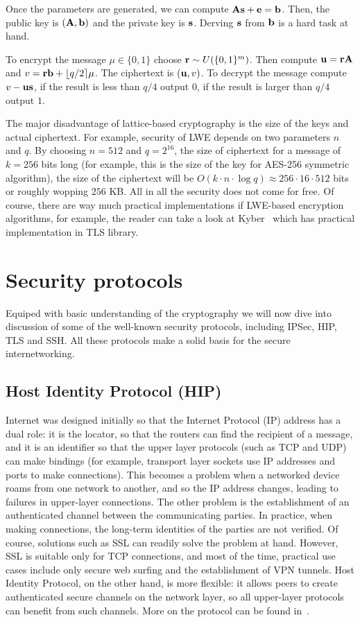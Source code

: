 Once the parameters are generated, we can compute ${\bf As}+{\bf e} = {\bf b}$. Then, the public 
key is $({\bf A, b})$ and the private key is ${\bf s}$. Derving ${\bf s}$ from ${\bf b}$ is a hard 
task at hand.

To encrypt the message $\mu \in \{0, 1\}$ choose ${\bf r} \sim U(\{0, 1\}^m)$. Then compute ${\bf u}={\bf rA}$ and 
$v={\bf rb}+\lfloor q/2 \rceil \mu$. The ciphertext is $({\bf u}, v)$. To decrypt the message 
compute $v - \bf{u s}$, if the result is less than $q/4$ output $0$, if the result
is larger than $q/4$ output $1$. 

The major disadvantage of lattice-based cryptography is the size of the keys and actual ciphertext. For example,
security of LWE depends on two parameters $n$ and $q$. By choosing $n=512$ and $q=2^{16}$, the size of ciphertext
for a message of $k=256$ bits long (for example, this is the size of the key for AES-256 symmetric algorithm), 
the size of the ciphertext will be $O(k \cdot n \cdot \log q) \approx 256 \cdot 16 \cdot 512$ bits or roughly wopping 
$256$ KB. All in all the security does not come for free. Of course, there are way much practical implementations
if LWE-based encryption algorithms, for example, the reader can take a look at Kyber~\cite{} which has practical 
implementation in TLS library.

\section{Security protocols}

Equiped with basic understanding of the cryptography we will now dive into discussion of some 
of the well-known security protocols, including IPSec, HIP, TLS and SSH. All these protocols
make a solid basis for the secure internetworking.

\subsection{Host Identity Protocol (HIP)}

Internet was designed initially so that the Internet Protocol (IP) address has a dual role: it 
is the locator, so that the routers can find the recipient of a message, and it is an identifier 
so that the upper layer protocols (such as TCP and UDP) can make bindings (for example, transport 
layer sockets use IP addresses and ports to make connections). This becomes a problem when a networked 
device roams from one network to another, and so the IP address changes, leading to failures in 
upper-layer connections. The other problem is the establishment of an authenticated channel between 
the communicating parties. In practice, when making connections, the long-term identities of the parties 
are not verified. Of course, solutions such as SSL can readily solve the problem at hand. However, SSL 
is suitable only for TCP connections, and most of the time, practical use cases include only secure web 
surfing and the establishment of VPN tunnels. Host Identity Protocol, on the other hand, is more flexible: 
it allows peers to create authenticated secure channels on the network layer, so all upper-layer protocols 
can benefit from such channels. More on the protocol can be found in~\cite{gurtov:hip}.

